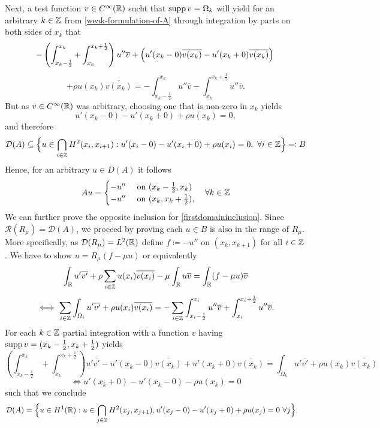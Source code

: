 Next, a test function $v \in C^{\infty}(\mathbb{R})$ sucht that $\operatorname{supp} v = \Omega_{k}$ will yield for an arbitrary $k \in \mathbb{Z}$ from \eqref{weak-formulation-of-A}   through integration by parts on both sides of $x_{k}$ that
	\[ -\left( \int_{x_{k}-\frac{1}{2}}^{x_{k}} + \int_{x_{k}}^{x_{k} + \frac{1}{2}}\right) u'' \overline{v} + \left( u'(x_{k}-0) \overline{v(x_{k})} - u'(x_{k} + 0) \overline{v(x_{k})} \right) \\ \]
	\[ +  \rho u(x_{k})\overline{v(x_{k})} = - \int_{x_{k} - \frac{1}{2}}^{x_{k}} u'' \overline{v} - \int_{x_{k}}^{x_{k} + \frac{1}{2}} u'' \overline{v}. \]
But as $v \in C^{\infty}(\mathbb{R})$ was arbitrary, choosing one that is non-zero in $x_{k}$ yields 
	\[ u'(x_{k}-0) - u'(x_{k}+0) + \rho u(x_{k}) = 0, \]
and therefore
	\begin{equation}
		\mathcal{D}(A) \subseteq \Big\{ u \in \bigcap_{i \in \mathbb{Z}} H^{2}(x_{i}, x_{i + 1}) : u'(x_{i} - 0) - u'(x_{i} + 0) + \rho u(x_{i}) = 0 , ~\forall i \in \mathbb{Z} \Big\} \eqqcolon B \label{firstdomaininclusion}
	\end{equation} 
Hence, for an arbitrary $u \in D(A)$ it follows
	\[ A u = \begin{cases}
					- u'' & \text{ on } (x_{k} - \frac{1}{2}, x_{k}) \\
					- u'' & \text{ on } (x_{k}, x_{k} + \frac{1}{2}),
			 \end{cases} \quad \forall k \in \mathbb{Z} \]
We can further prove the opposite inclusion for \eqref{firstdomaininclusion}. Since $\mathcal{R}(R_{\mu}) = \mathcal{D}(A)$, we proceed by proving each $u \in B$ is also in the range of $R_{\mu}$. More specifically, as $\mathcal{D}(R_{\mu}) = L^{2}(\mathbb{R})$ define $f \coloneqq - u''$ on $(x_{k}, x_{k + 1})$ for all $i \in \mathbb{Z}$. We have to show $u = R_{\mu}(f - \mu u)$ or equivalently
	\[ \int_{\mathbb{R}} u' \overline{v'} + \rho \sum_{i \in \mathbb{Z}} u(x_{i}) \overline{v(x_{i})} - \mu \int_{\mathbb{R}} u \overline{v}= \int_{\mathbb{R}}(f-\mu u) \overline{v} \]
	\[ \iff \sum_{i \in \mathbb{Z}} \int_{\Omega_{i}} u' \overline{v'} + \rho u(x_{i}) \overline{v(x_{i})} = - \sum_{i \in \mathbb{Z}} \int_{x_{i} - \frac{1}{2}}^{x_{i}} u'' \overline{v} + \int_{x_{i}}^{x_{i} + \frac{1}{2}} u'' \overline{v}. \]
	For each $k \in \mathbb{Z}$ partial integration with a function $v$ having $\operatorname{supp} v = (x_{k} - \frac{1}{2}, x_{k} + \frac{1}{2})$ yields
	\[ \left( \int_{x_{k} - \frac{1}{2}}^{x_{k}} + \int_{x_{k}}^{x_{k} +\frac{1}{2}} \right) u' \overline{v'} - u'(x_{k}-0) \overline{v(x_{k})}  + u'(x_{k}+0) \overline{v(x_{k})}  = \int_{\Omega_{k}} u' \overline{v'} + \rho u(x_{k}) \overline{v(x_{k})} \]
	\[ \iff u'(x_{k}+0) - u'(x_{k}-0) - \rho u(x_{k}) = 0 \]
	such that we conclude
	\begin{align*}
		\mathcal{D}(A) & = \Big\{ u \in H^{1}(\mathbb{R}): u \in \bigcap_{j \in \mathbb{Z}} H^{2}(x_{j} , x_{j+1}), u'(x_{j} - 0) - u'(x_{j} + 0) + \rho u(x_{j}) = 0 ~\forall j \Big\}.
	\end{align*}

